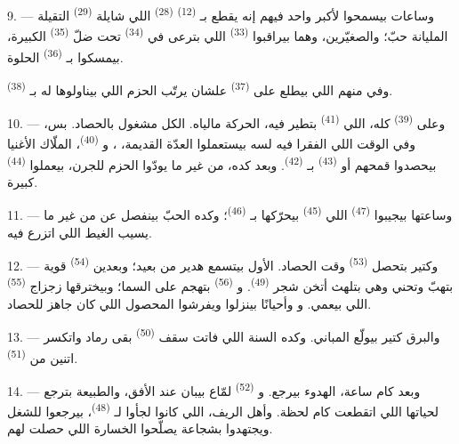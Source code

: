 9. --- وساعات بيسمحوا لأكبر واحد فيهم إنه يقطع بـ \textsuperscript{(12)}
 \textsuperscript{(28)} اللي شايلة 
\textsuperscript{(29)} التقيلة المليانة حبّ؛ والصغيّرين، وهما بيراقبوا
 \textsuperscript{(33)} اللي بترعى في 
\textsuperscript{(34)} تحت ضلّ  \textsuperscript{(35)} الكبيرة،
بيمسكوا بـ \textsuperscript{(36)}  الحلوة.

وفي منهم اللي بيطلع على  \textsuperscript{(37)} علشان يرتّب الحزم
اللي بيناولوها له بـ \textsuperscript{(38)}.

10. --- وعلى  \textsuperscript{(39)} كله، اللي 
\textsuperscript{(41)} بتطير فيه، الحركة مالياه. الكل مشغول بالحصاد. بس، وفي الوقت
اللي الفقرا فيه لسه بيستعملوا العدّة القديمة، ، و \textsuperscript{(40)}، الملّاك الأغنيا بيحصدوا قمحهم أو 
\textsuperscript{(43)} بـ \textsuperscript{(42)}. وبعد كده، من
غير ما يودّوا الحزم للجرن، بيعملوا  \textsuperscript{(44)} كبيرة.

11. --- وساعتها بيجيبوا  \textsuperscript{(47)} اللي
 \textsuperscript{(45)} بيحرّكها بـ \textsuperscript{(46)}؛
وكده الحبّ بينفصل عن  من غير ما يسيب الغيط اللي اتزرع فيه.

\VUsaut{5.0mm}
\VUsaut{3.4mm}

12. --- وكتير بتحصل  \textsuperscript{(53)} وقت الحصاد. الأول بيتسمع
هدير  من بعيد؛ وبعدين  \textsuperscript{(54)} قوية
بتهبّ وتحني وهي بتلهث أتخن شجر  \textsuperscript{(49)}.
و \textsuperscript{(56)} بتهجم على السما؛ وبيخترقها زجزاج
 \textsuperscript{(55)} اللي بيعمي. و وأحيانًا
 بينزلوا ويفرشوا المحصول اللي كان جاهز للحصاد.

13. --- والبرق كتير بيولّع المباني. وكده السنة اللي فاتت سقف  \textsuperscript{(50)} بقى رماد واتكسر اتنين من 
\textsuperscript{(51)}.

14. --- وبعد كام ساعة، الهدوء بيرجع. و \textsuperscript{(52)} لمّاع
بيبان عند الأفق، والطبيعة بترجع لحياتها اللي اتقطعت كام لحظة. وأهل الريف، اللي
كانوا لجأوا لـ \textsuperscript{(48)}، بيرجعوا للشغل ويجتهدوا بشجاعة
يصلّحوا الخسارة اللي حصلت لهم.

